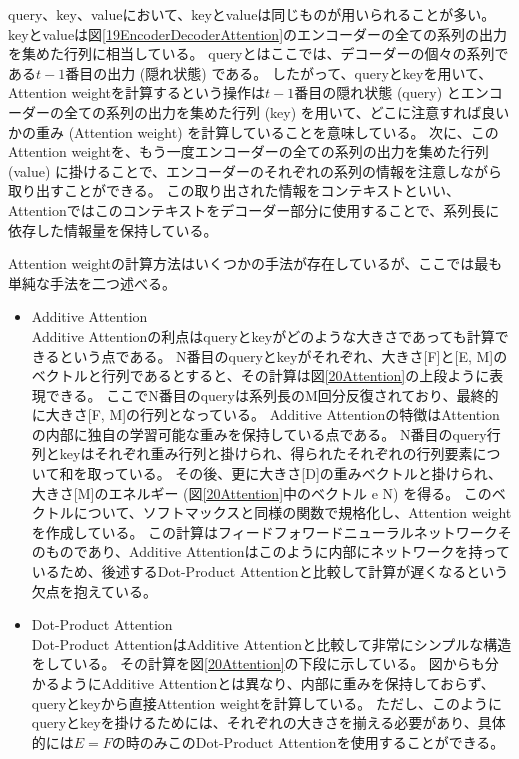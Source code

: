 query、key、valueにおいて、keyとvalueは同じものが用いられることが多い。
keyとvalueは図\ref{19EncoderDecoderAttention}のエンコーダーの全ての系列の出力を集めた行列に相当している。
queryとはここでは、デコーダーの個々の系列である$t-1$番目の出力 (隠れ状態) である。
したがって、queryとkeyを用いて、Attention weightを計算するという操作は$t-1$番目の隠れ状態 (query) とエンコーダーの全ての系列の出力を集めた行列 (key) を用いて、どこに注意すれば良いかの重み (Attention weight) を計算していることを意味している。
次に、このAttention weightを、もう一度エンコーダーの全ての系列の出力を集めた行列 (value) に掛けることで、エンコーダーのそれぞれの系列の情報を注意しながら取り出すことができる。
この取り出された情報をコンテキストといい、Attentionではこのコンテキストをデコーダー部分に使用することで、系列長に依存した情報量を保持している。

Attention weightの計算方法はいくつかの手法が存在しているが、ここでは最も単純な手法を二つ述べる。
\begin{itemize}
  \item Additive Attention\cite{BahdanauAttention}\\
  Additive Attentionの利点はqueryとkeyがどのような大きさであっても計算できるという点である。
  N番目のqueryとkeyがそれぞれ、大きさ[F]と[E, M]のベクトルと行列であるとすると、その計算は図\ref{20Attention}の上段ように表現できる。
  ここでN番目のqueryは系列長のM回分反復されており、最終的に大きさ[F, M]の行列となっている。
  Additive Attentionの特徴はAttentionの内部に独自の学習可能な重みを保持している点である。
  N番目のquery行列とkeyはそれぞれ重み行列と掛けられ、得られたそれぞれの行列要素について和を取っている。
  その後、更に大きさ[D]の重みベクトルと掛けられ、大きさ[M]のエネルギー (図\ref{20Attention}中のベクトル e N) を得る。
  このベクトルについて、ソフトマックスと同様の関数で規格化し、Attention weightを作成している。
  この計算はフィードフォワードニューラルネットワークそのものであり、Additive Attentionはこのように内部にネットワークを持っているため、後述するDot-Product Attentionと比較して計算が遅くなるという欠点を抱えている。

  \item Dot-Product Attention\cite{LuongAttention}\\
  Dot-Product AttentionはAdditive Attentionと比較して非常にシンプルな構造をしている。
  その計算を図\ref{20Attention}の下段に示している。
  図からも分かるようにAdditive Attentionとは異なり、内部に重みを保持しておらず、queryとkeyから直接Attention weightを計算している。
  ただし、このようにqueryとkeyを掛けるためには、それぞれの大きさを揃える必要があり、具体的には$E=F$の時のみこのDot-Product Attentionを使用することができる。
\end{itemize}
  
